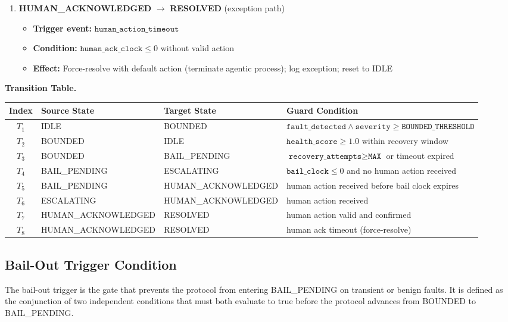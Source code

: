 \begin{enumerate}
  \item \textbf{HUMAN\_ACKNOWLEDGED} $\rightarrow$ \textbf{RESOLVED} (exception path)
  \begin{itemize}
    \item \textbf{Trigger event:} $\texttt{human\_action\_timeout}$
    \item \textbf{Condition:} $\texttt{human\_ack\_clock} \leq 0$ without valid action
    \item \textbf{Effect:} Force-resolve with default action (terminate agentic process); log exception; reset to IDLE
  \end{itemize}
\end{enumerate}

\bigskip

\noindent\textbf{Transition Table.}

\begin{center}
\begin{tabular}{clll}
\toprule
Index & Source State & Target State & Guard Condition \\ \midrule
$T_1$ & IDLE & BOUNDED & $\texttt{fault\_detected} \land \texttt{severity} \geq \texttt{BOUNDED\_THRESHOLD}$ \\[4pt]
$T_2$ & BOUNDED & IDLE & $\texttt{health\_score} \geq 1.0$ within recovery window \\[4pt]
$T_3$ & BOUNDED & BAIL\_PENDING & $\texttt{recovery\_attempts} \geq \texttt{MAX}$ or timeout expired \\[4pt]
$T_4$ & BAIL\_PENDING & ESCALATING & $\texttt{bail\_clock} \leq 0$ and no human action received \\[4pt]
$T_5$ & BAIL\_PENDING & HUMAN\_ACKNOWLEDGED & human action received before bail clock expires \\[4pt]
$T_6$ & ESCALATING & HUMAN\_ACKNOWLEDGED & human action received \\[4pt]
$T_7$ & HUMAN\_ACKNOWLEDGED & RESOLVED & human action valid and confirmed \\[4pt]
$T_8$ & HUMAN\_ACKNOWLEDGED & RESOLVED & human ack timeout (force-resolve) \\
\bottomrule
\end{tabular}
\end{center}

\subsection{Bail-Out Trigger Condition}

The bail-out trigger is the gate that prevents the protocol from entering BAIL\_PENDING on transient or benign faults. It is defined as the conjunction of two independent conditions that must both evaluate to true before the protocol advances from BOUNDED to BAIL\_PENDING.

